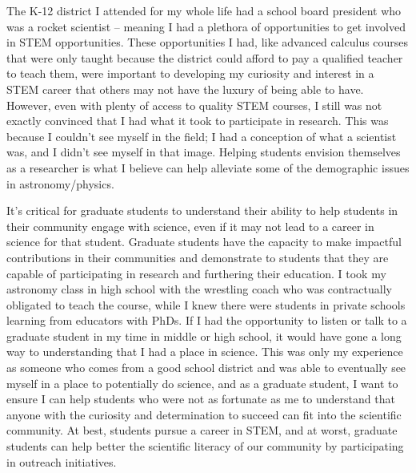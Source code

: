 \documentclass[11pt,letterpaper]{article}
\begin{document}
The K-12 district I attended for my whole life had a school board president who was a rocket scientist -- meaning I had a plethora of opportunities to get involved in STEM opportunities. These opportunities I had, like advanced calculus courses that were only taught because the district could afford to pay a qualified teacher to teach them, were important to developing my curiosity and interest in a STEM career that others may not have the luxury of being able to have. However, even with plenty of access to quality STEM courses, I still was not exactly convinced that I had what it took to participate in research. This was because I couldn't see myself in the field; I had a conception of what a scientist was, and I didn't see myself in that image. Helping students envision themselves as a researcher is what I believe can help alleviate some of the demographic issues in astronomy/physics.

It’s critical for graduate students to understand their ability to help students in their community engage with science, even if it may not lead to a career in science for that student. Graduate students have the capacity to make impactful contributions in their communities and demonstrate to students that they are capable of participating in research and furthering their education. I took my astronomy class in high school with the wrestling coach who was contractually obligated to teach the course, while I knew there were students in private schools learning from educators with PhDs. If I had the opportunity to listen or talk to a graduate student in my time in middle or high school, it would have gone a long way to understanding that I had a place in science. This was only my experience as someone who comes from a good school district and was able to eventually see myself in a place to potentially do science, and as a graduate student, I want to ensure I can help students who were not as fortunate as me to understand that anyone with the curiosity and determination to succeed can fit into the scientific community. At best, students pursue a career in STEM, and at worst, graduate students can help better the scientific literacy of our community by participating in outreach initiatives.
\end{document}
